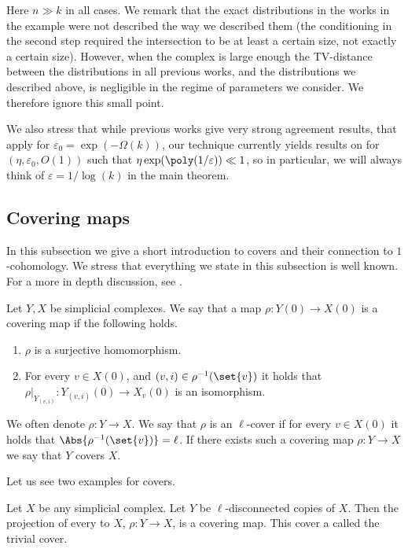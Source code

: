 Here \(n \gg k\) in all cases. We remark that the exact distributions in the works in the example were not described the way we described them (the conditioning in the second step required the intersection to be at least a certain size, not exactly a certain size). However, when the complex is large enough the TV-distance between the distributions in all previous works, and the distributions we described above, is negligible in the regime of parameters we consider. We therefore ignore this small point.

We also stress that while previous works give very strong agreement results, that apply for \(\varepsilon_0 = \exp(-\Omega(k))\), our technique currently yields results on for \((\eta,\varepsilon_0,O(1))\) such that \(\eta \exp(\poly(1/\varepsilon)) \ll 1\), so in particular, we will always think of \(\varepsilon = 1/\log(k)\) in the main theorem.

\subsection{Covering maps}
In this subsection we give a short introduction to covers and their connection to \(1\)-cohomology. We stress that everything we state in this subsection is well known. For a more in depth discussion, see \cite{Surowski1984}.

\begin{definition}\label{def:cover}
    Let \(Y,X\) be simplicial complexes. We say that a map \(\rho:Y(0) \to X(0)\) is a covering map if the following holds.
    \begin{enumerate}
        \item \(\rho\) is a surjective homomorphism.
        \item For every \(v \in X(0)\), and \((v,i) \in \rho^{-1}(\set{v})\) it holds that \(\rho|_{Y_{(v,i)}}:Y_{(v,i)}(0) \to X_v(0)\) is an isomorphism.
    \end{enumerate}
    We often denote \(\rho:Y\to X\). We say that \(\rho\) is an \(\ell\)-cover if for every \(v \in X(0)\) it holds that \(\Abs{\rho^{-1}(\set{v})}=\ell\). If there exists such a covering map \(\rho:Y\to X\) we say that \(Y\) covers \(X\).
\end{definition}

Let us see two examples for covers.
\begin{example} \label{ex:trivial-cover}
    Let \(X\) be any simplicial complex. Let \(Y\) be \(\ell\)-disconnected copies of \(X\). Then the projection of every to \(X\), \(\rho:Y \to X\), is a covering map. This cover a called the trivial cover.
\end{example}

